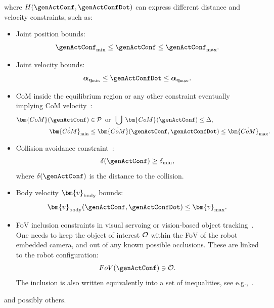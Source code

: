 \begin{itemize}
\begin{equation}
	\end{equation}
	where $H(\genActConf,\genActConfDot)$ can express different distance and velocity constraints, such as: 
	\begin{itemize}
		\item Joint position bounds:
		\begin{equation}\label{eq-chap0:joint position constraint}
			\genActConf_{\min}\leq\genActConf\leq \genActConf_{\max}.
		\end{equation}
		\item Joint velocity bounds:
		\begin{equation}\label{eq-chap0:joint velocity constraint}
			\boldsymbol{\alpha}_{{\mathbf{q}}_{\min}}\leq\genActConfDot\leq \boldsymbol{\alpha}_{{\mathbf{q}}_{\max}}.
		\end{equation}
		\item CoM  inside the equilibrium region or any other constraint eventually implying CoM velocity~\cite{audren2018tro}:
		\begin{align}\label{eq-chap0:com constraints}
			\bm{ CoM}(\genActConf)&\in {\cal P} \;\; {\rm or} \;\; \bigcup \; \bm{ CoM}(\genActConf)\leq \Delta,\\ 
			\bm{\dot{CoM}}_{\min}&\leq\bm{\dot{CoM}}(\genActConf,\genActConfDot)\leq \bm{\dot{CoM}}_{\max}.
		\end{align}
		\item Collision avoidance constraint~\cite{vaillant2016springer,vaillant2016trvcg}:
		\begin{equation}\label{eq-chap0:generic distance constraint}
			\delta(\genActConf)\geq\delta_{\min},
		\end{equation}
		where $\delta(\genActConf)$ is the distance to the collision.
		\item Body velocity $\bm{v}_{\rm body}$ bounds:
		\begin{equation}
			\bm{v}_{\rm body}(\genActConf,\genActConfDot) \leq \bm{v}_{\max}.
		\end{equation}
		\item  FoV  inclusion constraints in visual servoing or vision-based object tracking~\cite{paolillo2018ral}. One needs to keep the object of interest $\cal O$ within the FoV of the robot embedded camera, and out of any known possible occlusions. These are linked to the robot configuration:
		\begin{equation}
			FoV(\genActConf) \ni {\cal O}.
		\end{equation} The inclusion is also  written equivalently into a set of inequalities, see e.g.,~\cite{agravante2017ral}.
	\end{itemize}
and possibly others.
\end{itemize}


